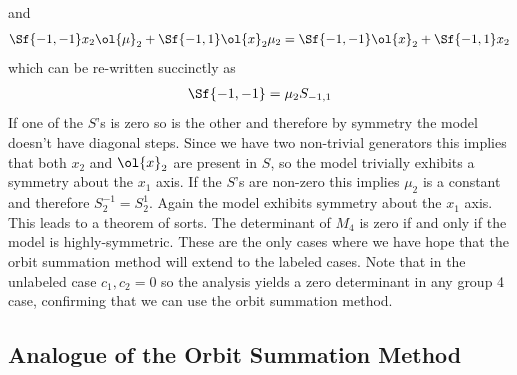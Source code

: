 and
\begin{align}
	\Sf{-1,-1}x_2 \ol{\mu}_2+\Sf{-1,1}\ol{x}_2\mu_2 = \Sf{-1,-1}\ol{x}_2+\Sf{-1,1}x_2
\end{align}
which can be re-written succinctly as
\begin{align}
	\Sf{-1,-1} = \mu_2 S_{-1,1}
\end{align}
If one of the $S$'s is zero so is the other and therefore by symmetry the model doesn't have diagonal steps. Since we have two non-trivial generators this implies that both $x_2$ and $\ol{x}_2$ are present in $S$, so the model trivially exhibits a symmetry about the $x_1$ axis. If the $S$'s are non-zero this implies $\mu_2$ is a constant and therefore $S_2^{-1} = S_2^1$. Again the model exhibits symmetry about the $x_1$ axis. This leads to a theorem of sorts. The determinant of $M_4$ is zero if and only if the model is highly-symmetric. These are the only cases where we have hope that the orbit summation method will extend to the labeled cases. Note that in the unlabeled case $c_1,c_2 = 0$ so the analysis yields a zero determinant in any group 4 case, confirming that we can use the orbit summation method.

\subsection{Analogue of the Orbit Summation Method}


